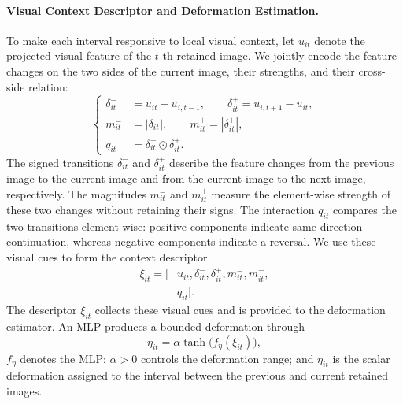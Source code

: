 \paragraph{Visual Context Descriptor and Deformation Estimation.}
To make each interval responsive to local visual context, let $u_{it}$ denote
the projected visual feature of the $t$-th retained image.  We jointly encode
the feature changes on the two sides of the current image, their strengths,
and their cross-side relation:
\begin{equation}
\left\{
\begin{aligned}
\delta^-_{it}&=u_{it}-u_{i,t-1},\qquad
\delta^+_{it}=u_{i,t+1}-u_{it},\\
m^-_{it}&=|\delta^-_{it}|,\qquad
m^+_{it}=|\delta^+_{it}|,\\
q_{it}&=\delta^-_{it}\odot\delta^+_{it}.
\end{aligned}
\right.
\label{eq:acpe_visual_context}
\end{equation}
The signed transitions $\delta^-_{it}$ and $\delta^+_{it}$ describe the feature changes
from the previous image to the current image and from the current image to the
next image, respectively.  The magnitudes $m^-_{it}$ and $m^+_{it}$ measure
the element-wise strength of these two changes without retaining their signs.
The interaction $q_{it}$ compares the two transitions element-wise: positive
components indicate same-direction continuation, whereas negative components
indicate a reversal.  We use these visual cues to form the context descriptor
\begin{equation}
\begin{aligned}
\xi_{it}=\bigl[&u_{it},\delta^-_{it},\delta^+_{it},
m^-_{it},m^+_{it},\\[-1mm]
&q_{it}\bigr].
\end{aligned}
\label{eq:acpe_descriptor}
\end{equation}
The descriptor $\xi_{it}$ collects these visual cues and is provided to the
deformation estimator.
An MLP produces a bounded deformation through
\begin{equation}
\eta_{it}=\alpha\tanh\!\bigl(f_\eta(\xi_{it})\bigr),
\label{eq:acpe_deformation}
\end{equation}
$f_\eta$ denotes the MLP; $\alpha>0$ controls the deformation range; and
$\eta_{it}$ is the scalar deformation assigned to the interval between the
previous and current retained images.

